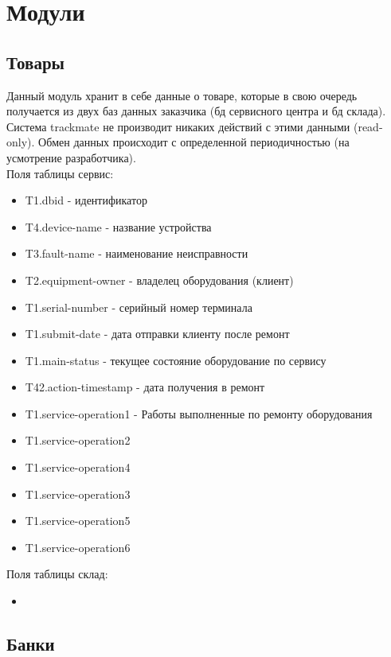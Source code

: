 \documentclass[DIV=calc, paper=a4, fontsize=11pt]{scrartcl} %
\begin{document}
\section{Модули}

\subsection{Товары}

Данный модуль хранит в себе данные о товаре, которые в свою очередь получается из двух баз данных заказчика (бд сервисного центра и бд склада). Система trackmate не производит никаких действий с этими данными (read-only). Обмен данных происходит с определенной периодичностью (на усмотрение разработчика).
\\[0.5cm]
Поля таблицы сервис:

\begin{itemize}
	\item T1.dbid - идентификатор
	\item T4.device-name - название устройства
	\item T3.fault-name - наименование неисправности
	\item T2.equipment-owner - владелец оборудования (клиент)
	\item T1.serial-number - серийный номер терминала
	\item T1.submit-date - дата отправки клиенту после ремонт
	\item T1.main-status - текущее состояние оборудование по сервису
	\item T42.action-timestamp - дата получения в ремонт
	\item T1.service-operation1 - Работы выполненные по ремонту оборудования
	\item T1.service-operation2
	\item T1.service-operation4
	\item T1.service-operation3
	\item T1.service-operation5
	\item T1.service-operation6
\end{itemize}

Поля таблицы склад:

\begin{itemize}
	\item 
\end{itemize}

\subsection{Банки}
\end{document}
